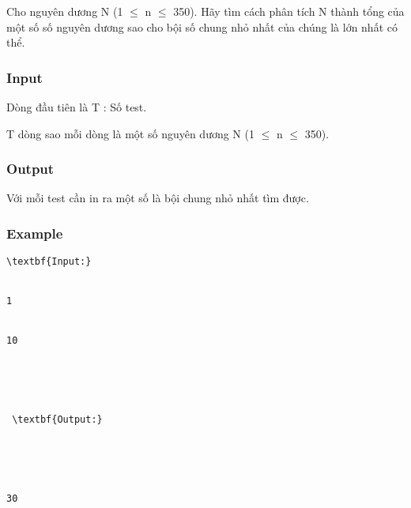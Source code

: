 



   Cho nguyên dương N (1 $\le$ n $\le$ 350). Hãy tìm cách phân tích N thành tổng của một số số nguyên dương sao cho bội số chung nhỏ nhất của chúng là lớn nhất có thể.  

\subsubsection{   Input  }

   Dòng đầu tiên là T : Số test.  

   T dòng sao mỗi dòng là một số nguyên dương N (1 $\le$ n  $\le$ 350).  

\subsubsection{   Output  }

   Với mỗi test cần in ra một số là bội chung nhỏ nhất tìm được.  



\subsubsection{   Example  }
\begin{verbatim}
\textbf{Input:}


1


10





 \textbf{Output:}





30


\end{verbatim}
